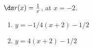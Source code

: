 {$\ds r(x) = \frac{1}{x}$, at $x=-2$.
}
{\begin{enumerate}
\item		$y = -1/4(x+2) - 1/2$
\item		$y = 4(x+2) - 1/2$
\end{enumerate}
}

